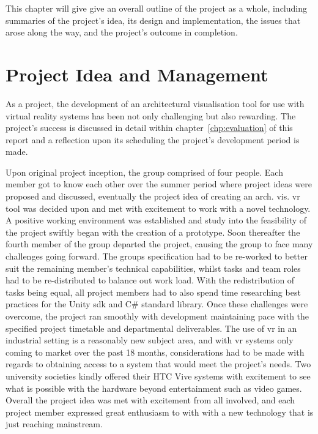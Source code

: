 This chapter will give give an overall outline of the project as a whole, including summaries of the project's idea, its design and implementation, the issues that arose along the way, and the project's outcome in completion.

\section{Project Idea and Management}

    As a project, the development of an architectural visualisation tool for use with virtual reality systems has been not only challenging but also rewarding. The project's success is discussed in detail within chapter~\ref{chp:evaluation} of this report and a reflection upon its scheduling the project's development period is made.
    
    Upon original project inception, the group comprised of four people. Each member got to know each other over the summer period where project ideas were proposed and discussed, eventually the project idea of creating an arch. vis. \acrshort{vr} tool was decided upon and met with excitement to work with a novel technology. A positive working environment was established and study into the feasibility of the project swiftly began with the creation of a prototype. Soon thereafter the fourth member of the group departed the project, causing the group to face many challenges going forward. The groups specification had to be re-worked to better suit the remaining member's technical capabilities, whilst tasks and team roles had to be re-distributed to balance out work load. With the redistribution of tasks being equal, all project members had to also spend time researching best practices for the Unity \acrshort{sdk} and C\# standard library. Once these challenges were overcome, the project ran smoothly with development maintaining pace with the specified project timetable and departmental deliverables. The use of \acrshort{vr} in an industrial setting is a reasonably new subject area, and with \acrshort{vr} systems only coming to market over the past 18 months, considerations had to be made with regards to obtaining access to a system that would meet the project's needs. Two university societies kindly offered their HTC Vive systems with excitement to see what is possible with the hardware beyond entertainment such as video games. Overall the project idea was met with excitement from all involved, and each project member expressed great enthusiasm to with with a new technology that is just reaching mainstream.

